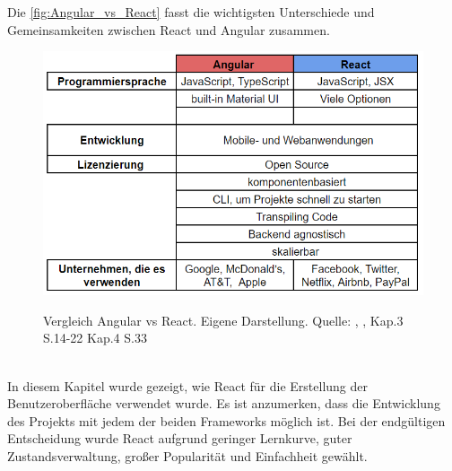 \newpage
Die \autoref{fig:Angular_vs_React} fasst die wichtigsten Unterschiede und Gemeinsamkeiten zwischen React und Angular zusammen.
\\
  \begin{figure}[h!]
    \centering
    \includegraphics[scale=0.5]{sources/Angular_vs_React}
    \caption[Vergleich Angular vs React]{}
    \label{fig:Angular_vs_React} 
    Vergleich Angular vs React. Eigene Darstellung. Quelle:
    \cite{AvsR}, {, Kap.3 S.14-22 Kap.4 S.33\cite{E01}}
  \end{figure}
\\
   In diesem Kapitel wurde gezeigt, wie React für die Erstellung der Benutzeroberfläche verwendet wurde. Es ist anzumerken, dass die Entwicklung des Projekts mit jedem der beiden Frameworks möglich ist. Bei der endgültigen Entscheidung wurde React aufgrund geringer Lernkurve, guter Zustandsverwaltung, großer Popularität und Einfachheit gewählt.

